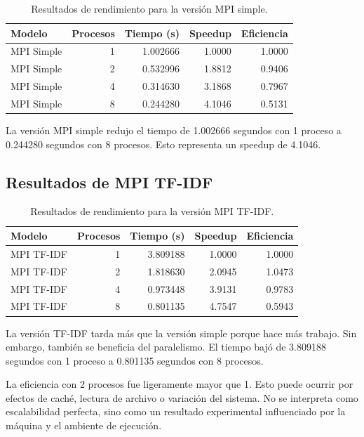 \documentclass[12pt,letterpaper]{article}
\begin{document}
\begin{table}[H]
\centering
\begin{tabular}{lrrrr}
\toprule
Modelo & Procesos & Tiempo (s) & Speedup & Eficiencia \\
\midrule
MPI Simple & 1 & 1.002666 & 1.0000 & 1.0000 \\
MPI Simple & 2 & 0.532996 & 1.8812 & 0.9406 \\
MPI Simple & 4 & 0.314630 & 3.1868 & 0.7967 \\
MPI Simple & 8 & 0.244280 & 4.1046 & 0.5131 \\
\bottomrule
\end{tabular}
\caption{Resultados de rendimiento para la versión MPI simple.}
\end{table}

La versión MPI simple redujo el tiempo de 1.002666 segundos con 1 proceso a 0.244280 segundos con 8 procesos. Esto representa un speedup de 4.1046.

\subsection{Resultados de MPI TF-IDF}

\begin{table}[H]
\centering
\begin{tabular}{lrrrr}
\toprule
Modelo & Procesos & Tiempo (s) & Speedup & Eficiencia \\
\midrule
MPI TF-IDF & 1 & 3.809188 & 1.0000 & 1.0000 \\
MPI TF-IDF & 2 & 1.818630 & 2.0945 & 1.0473 \\
MPI TF-IDF & 4 & 0.973448 & 3.9131 & 0.9783 \\
MPI TF-IDF & 8 & 0.801135 & 4.7547 & 0.5943 \\
\bottomrule
\end{tabular}
\caption{Resultados de rendimiento para la versión MPI TF-IDF.}
\end{table}

La versión TF-IDF tarda más que la versión simple porque hace más trabajo. Sin embargo, también se beneficia del paralelismo. El tiempo bajó de 3.809188 segundos con 1 proceso a 0.801135 segundos con 8 procesos.

La eficiencia con 2 procesos fue ligeramente mayor que 1. Esto puede ocurrir por efectos de caché, lectura de archivo o variación del sistema. No se interpreta como escalabilidad perfecta, sino como un resultado experimental influenciado por la máquina y el ambiente de ejecución.
\end{document}
